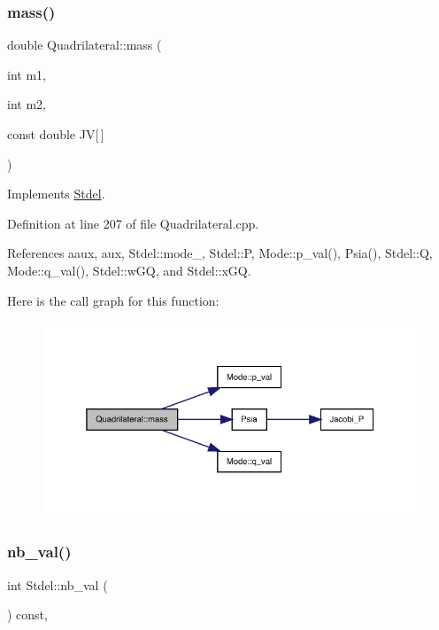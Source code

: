 \subsubsection{\texorpdfstring{mass()}{mass()}}
{\footnotesize\ttfamily double Quadrilateral\+::mass (\begin{DoxyParamCaption}\item[{int}]{m1,  }\item[{int}]{m2,  }\item[{const double}]{JV\mbox{[}$\,$\mbox{]} }\end{DoxyParamCaption})\hspace{0.3cm}{\ttfamily [virtual]}}



Implements \hyperlink{classStdel_ab475cc8bc82a3b8a5200d4d841ef0a51}{Stdel}.



Definition at line 207 of file Quadrilateral.\+cpp.



References aaux, aux, Stdel\+::mode\+\_\+, Stdel\+::P, Mode\+::p\+\_\+val(), Psia(), Stdel\+::Q, Mode\+::q\+\_\+val(), Stdel\+::w\+GQ, and Stdel\+::x\+GQ.

Here is the call graph for this function\+:
\nopagebreak
\begin{figure}[H]
\begin{center}
\leavevmode
\includegraphics[width=338pt]{classQuadrilateral_a63ff83a9100d597f694d76b3d5f147a5_cgraph}
\end{center}
\end{figure}
\mbox{\label{classStdel_a4fb0a049dc27d8e67665a56d1b5a18ba}} 
\subsubsection{\texorpdfstring{nb\+\_\+val()}{nb\_val()}}
{\footnotesize\ttfamily int Stdel\+::nb\+\_\+val (\begin{DoxyParamCaption}{ }\end{DoxyParamCaption}) const\hspace{0.3cm}{\ttfamily [inline]}, {\ttfamily [inherited]}}



